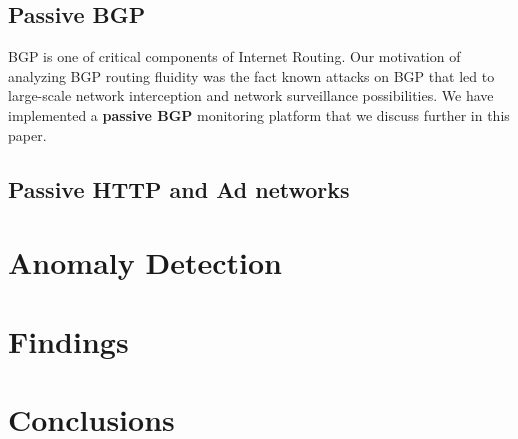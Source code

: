 \documentclass[times,5pt]{article}
\begin{document}
\subsection*{Passive BGP}
\label{sec-3-2}
BGP is one of critical components of Internet Routing. Our motivation
of analyzing BGP routing fluidity was the fact known
attacks on BGP\cite{youtubehijack} that led to large-scale network
interception and network surveillance possibilities. We have
implemented a \textbf{passive BGP} monitoring platform that we discuss
further in this paper.
\subsection*{Passive HTTP and Ad networks}
\label{sec-3-3}
\section*{Anomaly Detection}
\label{sec-4}

\section*{Findings}
\label{sec-5}

\section*{Conclusions}
\label{sec-6}





{}
\end{document}
